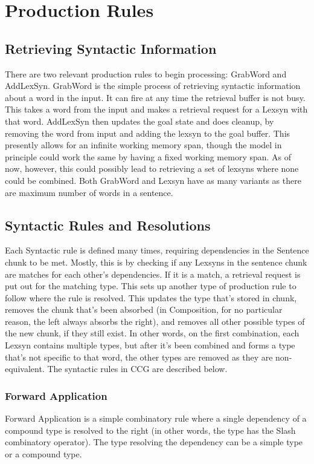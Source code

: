 \section{Production Rules}
\subsection{Retrieving Syntactic Information}
There are two relevant production rules to begin processing: GrabWord and AddLexSyn. GrabWord is the simple process of retrieving syntactic information about a word in the input. It can fire at any time the retrieval buffer is not busy. This takes a word from the input and makes a retrieval request for a Lexsyn with that word. AddLexSyn then updates the goal state and does cleanup, by removing the word from input and adding the lexsyn to the goal buffer. This presently allows for an infinite working memory span, though the model in principle could work the same by having a fixed working memory span. As of now, however, this could possibly lead to retrieving a set of lexsyns where none could be combined. Both GrabWord and Lexsyn have as many variants as there are maximum number of words in a sentence. 

\subsection{Syntactic Rules and Resolutions}
Each Syntactic rule is defined many times, requiring dependencies in the Sentence chunk to be met. Mostly, this is by checking if any Lexsyns in the sentence chunk are matches for each other's dependencies. If it is a match, a retrieval request is put out for the matching type. This sets up another type of production rule to follow where the rule is resolved. This updates the type that's stored in chunk, removes the chunk that's been absorbed (in Composition, for no particular reason, the left always absorbs the right), and removes all other possible types of the new chunk, if they still exist. In other words, on the first combination, each Lexsyn contains multiple types, but after it's been combined and forms a type that's not specific to that word, the other types are removed as they are non-equivalent. The syntactic rules in CCG are described below. 

\subsubsection{Forward Application}
Forward Application is a simple combinatory rule where a single dependency of a compound type is resolved to the right (in other words, the type has the Slash combinatory operator). The type resolving the dependency can be a simple type or a compound type. 
